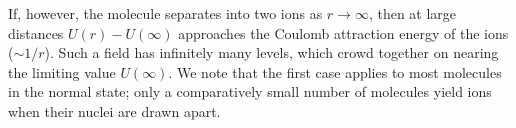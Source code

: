 If, however, the molecule separates into two ions as $r\to\infty$, then at large distances $U(r)-U(\infty)$ approaches the Coulomb attraction energy of the ions ($\sim1/r$). Such a field has infinitely many levels, which crowd together on nearing the limiting value $U(\infty)$. We note that the first case applies to most molecules in the normal state; only a comparatively small number of molecules yield ions when their nuclei are drawn apart.
